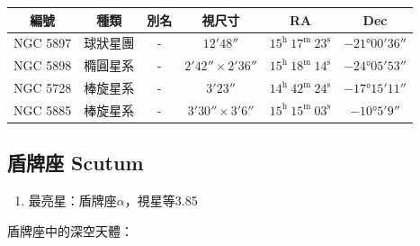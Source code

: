\begin{center}
\begin{longtable}{c | c | c | c | c | c}
    編號 & 種類 & 別名 & 視尺寸 & RA & Dec \\
    \hline
    \endfirsthead


    \endfoot

    \endlastfoot

    NGC 5897 & 球狀星團 & - & \(\ang{;12;48}\) & \(15^\text{h }17^\text{m }23^\text{s}\) & \(-\ang{21;00;36}\) \\ %
    NGC 5898 & 橢圓星系 & - & \(\ang{;2;42}\times\ang{;2;36}\) & \(15^\text{h }18^\text{m }14^\text{s}\) & \(-\ang{24;05;53}\) \\ %
    NGC 5728 & 棒旋星系 & - & \(\ang{;3;23}\) & \(14^\text{h }42^\text{m }24^\text{s}\) & \(-\ang{17;15;11}\) \\ %
    NGC 5885 & 棒旋星系 & - & \(\ang{;3;30}\times\ang{;3;6}\) & \(15^\text{h }15^\text{m }03^\text{s}\) & \(-\ang{10;5;9}\) \\ %
\end{longtable}
\end{center}

\subsection{盾牌座 Scutum}
\begin{enumerate}
    \item 最亮星：盾牌座\(\alpha\)，視星等3.85
\end{enumerate}
盾牌座中的深空天體：
\newline

